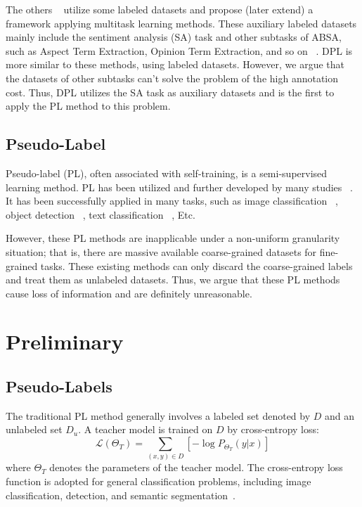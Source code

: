 \documentclass[11pt]{article}
\newcommand{\mL}{\mathcal{L}}
\begin{document}
The others ~\cite{he2018exploiting,he2019interactive,chen2019transfer,liang2020iterative,yang2019multi,oh2021deep,yu2021making,yan2021unified} utilize some labeled datasets and propose (later extend) a framework applying multitask learning methods. These auxiliary labeled datasets mainly include the sentiment analysis (SA) task and other subtasks of ABSA, such as Aspect Term Extraction, Opinion Term Extraction, and so on ~\cite{yan2021unified}. 
DPL is more similar to these methods, using labeled datasets. 
However, we argue that the datasets of other subtasks can't solve the problem of the high annotation cost.
Thus, DPL utilizes the SA task as auxiliary datasets and is the first to apply the PL method to this problem.

\subsection{Pseudo-Label}
Pseudo-label (PL), often associated with self-training, is a semi-supervised learning method. PL has been utilized and further developed by many studies ~\cite{ge2020mutual,mallis2020unsupervised,zoph2020rethinking,he2019revisiting}. It has been successfully applied in many tasks, such as image classification ~\cite{pham2020meta,xie2020self}, object detection ~\cite{ge2020mutual}, text classification ~\cite{mukherjee2020uncertainty}, Etc.

However, these PL methods are inapplicable under a non-uniform granularity situation; that is, there are massive available coarse-grained datasets for fine-grained tasks. These existing methods can only discard the coarse-grained labels and treat them as unlabeled datasets. Thus, we argue that these PL methods cause loss of information and are definitely unreasonable.















\section{Preliminary}
\subsection{Pseudo-Labels}
The traditional PL method generally involves a labeled set denoted by $D$ and an unlabeled set $D_u$.
A teacher model is trained on $D$ by cross-entropy loss:
\begin{equation}
    \mL(\Theta_{T}) = \sum_{(x,y) \in D} [-\log P_{\Theta_{T}}(y|x)]
\label{Teacher-Training}
\end{equation}
where $\Theta_{T}$ denotes the parameters of the teacher model.
The cross-entropy loss function is adopted for general classification problems, including image classification, detection, and semantic segmentation~\cite{ge2020mutual,pham2020meta,xie2020self,zoph2020rethinking}. 
\end{document}

